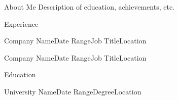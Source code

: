 \documentclass{resume}
\begin{document}
\begin{rSection}{About Me}
  Description of education, achievements, etc.
\end{rSection}

\begin{rSection}{Experience}

  \begin{rSubsection}{Company Name}{Date Range}{Job Title}{Location}
  \end{rSubsection}

  \begin{rSubsection}{Company Name}{Date Range}{Job Title}{Location}
  \end{rSubsection}

\end{rSection}

\begin{rSection}{Education}
  \begin{rSubsection}{University Name}{Date Range}{Degree}{Location}
  \end{rSubsection}
\end{rSection}
\end{document}
